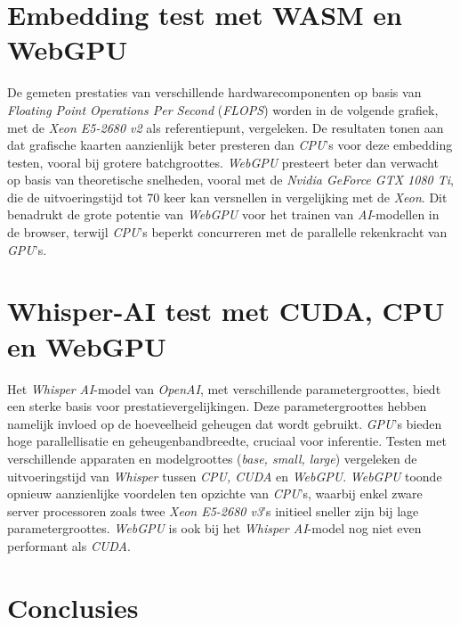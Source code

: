 \documentclass[a0,portrait]{hogent-poster}
\begin{document}
\begin{multicols}{2}
\section{Embedding test met WASM en WebGPU}

De gemeten prestaties van verschillende hardwarecomponenten op basis van \textit{Floating Point Operations Per Second} (\textit{FLOPS}) worden in de volgende grafiek, met de \textit{Xeon E5-2680 v2} als referentiepunt, vergeleken. De resultaten tonen aan dat grafische kaarten aanzienlijk beter presteren dan \textit{CPU}'s voor deze embedding testen, vooral bij grotere batchgroottes. \textit{WebGPU} presteert beter dan verwacht op basis van theoretische snelheden, vooral met de \textit{Nvidia GeForce GTX 1080 Ti}, die de uitvoeringstijd tot 70 keer kan versnellen in vergelijking met de \textit{Xeon}. Dit benadrukt de grote potentie van \textit{WebGPU} voor het trainen van \textit{AI}-modellen in de browser, terwijl \textit{CPU}'s beperkt concurreren met de parallelle rekenkracht van \textit{GPU}'s.

\bigbreak{}


\section{Whisper-AI test met CUDA, CPU en WebGPU}

Het \textit{Whisper} \textit{AI}-model van \textit{OpenAI}, met verschillende parametergroottes, biedt een sterke basis voor prestatievergelijkingen. Deze parametergroottes hebben namelijk invloed op de hoeveelheid geheugen dat wordt gebruikt. \textit{GPU}'s bieden hoge parallellisatie en geheugenbandbreedte, cruciaal voor inferentie. Testen met verschillende apparaten en modelgroottes (\textit{base, small, large}) vergeleken de uitvoeringstijd van \textit{Whisper} tussen \textit{CPU, CUDA} en \textit{WebGPU}. \textit{WebGPU} toonde opnieuw aanzienlijke voordelen ten opzichte van \textit{CPU}'s, waarbij enkel zware server processoren zoals twee \textit{Xeon E5-2680 v3}'s initieel sneller zijn bij lage parametergroottes. \textit{WebGPU} is ook bij het \textit{Whisper AI}-model nog niet even performant als \textit{CUDA}.



\section{Conclusies}


\end{multicols}
\end{document}
